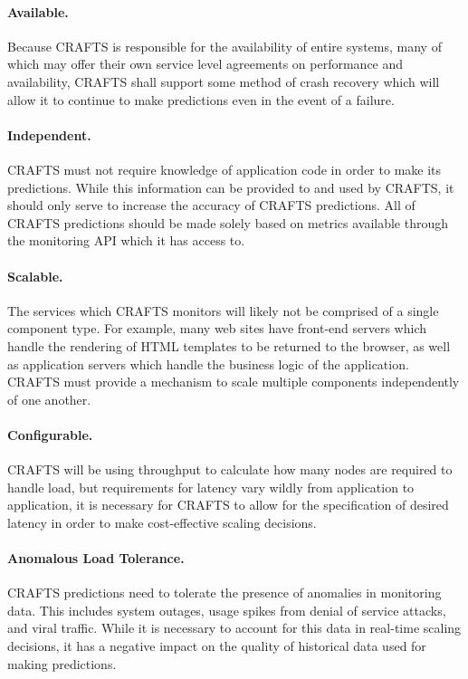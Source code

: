 \paragraph{Available.} Because CRAFTS is responsible for the availability of entire systems, many of which may offer their own service level agreements on performance and availability, CRAFTS shall support some method of crash recovery which will allow it to continue to make predictions even in the event of a failure.

\paragraph{Independent.} CRAFTS must not require knowledge of application code in order to make its predictions. While this information can be provided to and used by CRAFTS, it should only serve to increase the accuracy of CRAFTS predictions. All of CRAFTS predictions should be made solely based on metrics available through the monitoring API which it has access to.

\paragraph{Scalable.} The services which CRAFTS monitors will likely not be comprised of a single component type. For example, many web sites have front-end servers which handle the rendering of HTML templates to be returned to the browser, as well as application servers which handle the business logic of the application. CRAFTS must provide a mechanism to scale multiple components independently of one another.

\paragraph{Configurable.} CRAFTS will be using throughput to calculate how many nodes are required to handle load, but requirements for latency vary wildly from application to application, it is necessary for CRAFTS to allow for the specification of desired latency in order to make cost-effective scaling decisions.

\paragraph{Anomalous Load Tolerance.} CRAFTS predictions need to tolerate the presence of anomalies in monitoring data. This includes system outages, usage spikes from denial of service attacks, and viral traffic. While it is necessary to account for this data in real-time scaling decisions, it has a negative impact on the quality of historical data used for making predictions.

